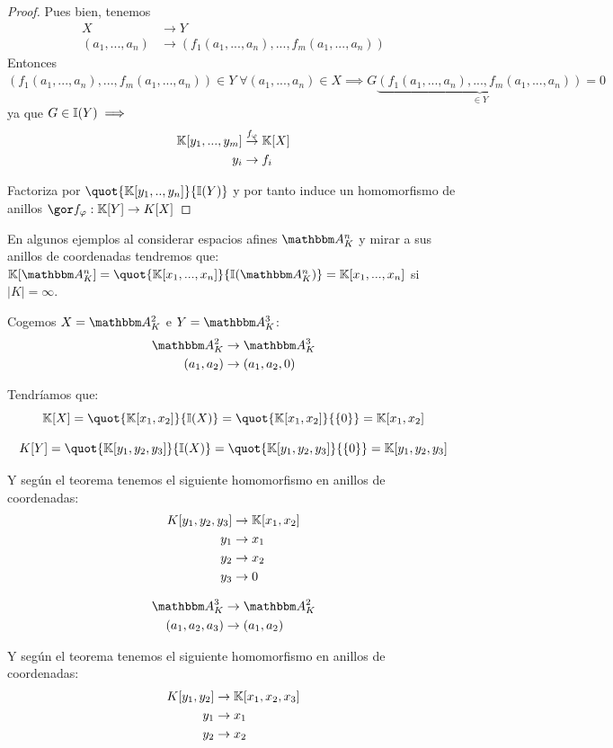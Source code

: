 \begin{proof}
Pues bien, tenemos
\begin{align*}
	X & \rightarrow Y \\
	(a_1,...,a_n) & \rightarrow (f_1(a_1,...,a_n),...,f_m(a_1,...,a_n))
\end{align*}
Entonces $(f_1(a_1,...,a_n),...,f_m(a_1,...,a_n)) \in Y \; \forall (a_1,...,a_n) \in X \implies G\underbrace{(f_1(a_1,...,a_n),...,f_m(a_1,...,a_n))}_{\in Y}=0$ ya que $G \in \mathbb{I}(Y) \implies $
\begin{align*}
	\mathbb{K}[y_1,...,y_m] & \stackrel{f_{\varphi}}{\rightarrow} \mathbb{K}[X] \\
	y_i & \rightarrow f_i
\end{align*}

Factoriza por $\quot{\K[y_1,..,y_n]}{\I(Y)}$ y por tanto induce un homomorfismo de anillos $\cls{f_{\varphi}}: \K[Y] \rightarrow K[X]$
\end{proof}

\nota En algunos ejemplos al considerar espacios afines $\Akn$ y mirar a sus anillos de coordenadas tendremos que: $\K[\Akn]=\quot{\K[x_1,...,x_n]}{\I(\Akn)}=\K[x_1,...,x_n]$ si $|K|=\infty$.

\begin{example}
	Cogemos $X=\A_K^2$ e $Y=\A_K^3$:
	\begin{align*}
		\A_K^2 & \rightarrow \A_K^3 \\
		(a_1,a_2) & \rightarrow (a_1,a_2,0)
	\end{align*}

	Tendríamos que: $$\K[X]=\quot{\K[x_1,x_2]}{\I(X)}=\quot{\K[x_1,x_2]}{\{0\}} = \K[x_1,x_2]$$

	$$ K[Y]=\quot{\K[y_1,y_2,y_3]}{\I(X)}=\quot{\K[y_1,y_2,y_3]}{\{0\}} = \K[y_1,y_2,y_3] $$

	Y según el teorema tenemos el siguiente homomorfismo en anillos de coordenadas:
	\begin{align*}
		K[y_1,y_2,y_3] & \rightarrow \mathbb{K}[x_1,x_2] \\
		y_1 & \rightarrow x_1 \\
		y_2 & \rightarrow x_2 \\
		y_3 & \rightarrow 0 \\
	\end{align*}
\end{example}


	\begin{example}
		\begin{align*}
			\A_K^3 & \rightarrow \A_K^2 \\
			(a_1,a_2,a_3) & \rightarrow (a_1,a_2)
		\end{align*}

		Y según el teorema tenemos el siguiente homomorfismo en anillos de coordenadas:
		\begin{align*}
			K[y_1,y_2] & \rightarrow \mathbb{K}[x_1,x_2,x_3] \\
			y_1 & \rightarrow x_1 \\
			y_2 & \rightarrow x_2 \\
		\end{align*}
	\end{example}

